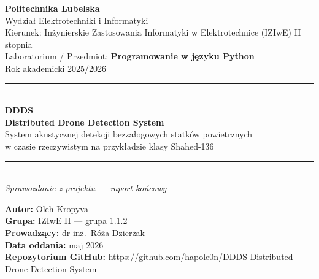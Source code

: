 \documentclass[11pt,a4paper]{article}
\begin{document}
\begin{titlepage}
\centering
\vspace*{1.5cm}

{\Large\bfseries Politechnika Lubelska}\\[0.2cm]
{\normalsize Wydział Elektrotechniki i Informatyki}\\[0.2cm]
{\normalsize Kierunek: Inżynierskie Zastosowania Informatyki w Elektrotechnice (IZIwE) II stopnia}\\[0.2cm]
{\normalsize Laboratorium / Przedmiot: \textbf{Programowanie w języku Python}}\\[0.2cm]
{\normalsize Rok akademicki 2025/2026}\\[1.0cm]

\rule{\linewidth}{0.5mm}\\[0.5cm]
{\Huge\bfseries\color{accent} DDDS}\\[0.20cm]
{\Large\bfseries\color{accent2} Distributed Drone Detection System}\\[0.35cm]
{\large System akustycznej detekcji bezzałogowych statków powietrznych\\
w czasie rzeczywistym na przykładzie klasy Shahed-136}\\[0.4cm]
\rule{\linewidth}{0.5mm}\\[1.6cm]

{\Large\itshape Sprawozdanie z projektu --- raport końcowy}\\[2.5cm]

\begin{flushleft}
\large
\textbf{Autor:}\hspace{1cm} Oleh Kropyva\\[0.3cm]
\textbf{Grupa:}\hspace{1.2cm} IZIwE II --- grupa 1.1.2\\[0.3cm]
\textbf{Prowadzący:}\hspace{0.2cm} dr inż.\ Róża Dzierżak\\[0.3cm]
\textbf{Data oddania:}\hspace{0.1cm} maj 2026\\[0.3cm]
\textbf{Repozytorium GitHub:} \url{https://github.com/hapole0n/DDDS-Distributed-Drone-Detection-System}
\end{flushleft}
\end{titlepage}

\tableofcontents
\newpage
\end{document}

